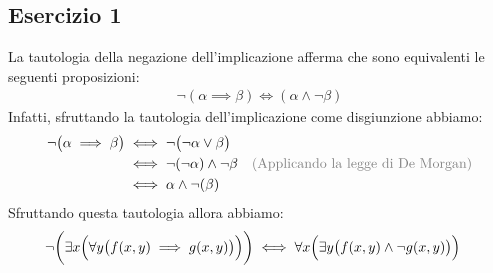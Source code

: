 \subsection*{Esercizio 1}
La tautologia della negazione dell'implicazione afferma che sono equivalenti le seguenti proposizioni:
\begin{align*}
	\neg(\alpha \implies \beta) \iff (\alpha \land \neg \beta)
\end{align*}
Infatti, sfruttando la tautologia dell'implicazione come disgiunzione abbiamo:
\begin{align*}
	\neg \bigl(\alpha \implies \beta \bigr) &\iff \neg \bigl( \neg \alpha \lor \beta \bigr) \\
	&\iff \neg (\neg \alpha) \land \neg \beta & \text{\textcolor{gray}{(Applicando la legge di De Morgan)}} \\
	&\iff \alpha \land \neg(\beta)
\end{align*}
Sfruttando questa tautologia allora abbiamo:
\begin{align*}
	\neg \biggl(\exists x \Bigl(\forall y \bigl( f(x,y) \implies g(x,y) \bigr)\Bigr)\biggr) &\iff \forall x \Bigl( \exists y \bigl( f(x,y) \land \neg g(x,y) \bigr)\Bigr)
\end{align*}
